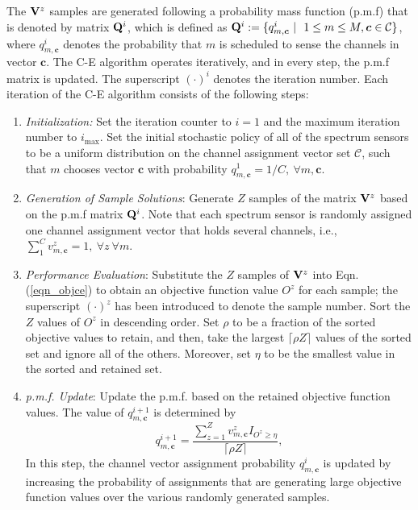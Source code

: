 \documentclass[journal]{IEEEtran} \ifCLASSINFOpdf
\begin{document}
The ${\bf V}^z$ samples are generated following a probability mass function (p.m.f) that is denoted by matrix ${\bf Q}^i$, which is defined as ${\bf Q}^i := \{q_{m,\bm{c}}^i~|~\ 1 \leq m \leq M, \bm{c} \in \mathcal{C}\}$, where $q_{m,\bm{c}}^i$ denotes the probability that $m$ is scheduled to sense the channels in vector $\bm{c}$. The C-E algorithm operates iteratively, and in every step, the p.m.f matrix is updated. The superscript $(\cdot)^i$ denotes the iteration number. Each iteration of the C-E algorithm consists of the following steps:
\begin{enumerate}[]
\item \textit{Initialization:} Set the iteration counter to $i = 1$ and the maximum iteration number to $i_{\max}$. Set the initial stochastic policy of all of the spectrum sensors to be a uniform distribution on the channel assignment vector set $\mathcal{C}$, such that $m$ chooses vector $\bm{c}$ with probability $q_{m,\bm{c}}^1 = 1/C, ~\forall m, \bm{c}$.

\item \textit{Generation of Sample Solutions}: Generate $Z$ samples of the matrix ${\bf V}^z$ based on the p.m.f matrix ${\bf Q}^i$. Note that each spectrum sensor is randomly assigned one channel assignment vector that holds several channels, i.e., $\sum_{1}^{C} v^z_{m,\bm{c}} =1, ~ \forall z ~\forall m$. \label{ce_gs}

\item \textit{Performance Evaluation}: Substitute the $Z$ samples of ${\bf V}^z$ into Eqn. (\ref{eqn_objce}) to obtain an objective function value $O^z$ for each sample; the superscript $(\cdot)^z$ has been introduced to denote the sample number. Sort the $Z$ values of $O^z$ in descending order. Set $\rho$ to be a fraction of the sorted objective values to retain, and then, take the largest $\lceil \rho Z \rceil$ values of the sorted set and ignore all of the others. Moreover, set $\eta$ to be the smallest value in the sorted and retained set.

\item \textit{p.m.f. Update}: Update the p.m.f. based on the retained objective function values. The value of $q_{m,\bm{c}}^{i+1}$ is determined by
    \begin{equation}
    \label{C-D_Update}
    q_{m,\bm{c}}^{i+1} = \frac{\sum_{z=1}^Z v^z_{m,\bm{c}} I_{O^z \geq \eta}}{\lceil \rho Z \rceil},
    \end{equation}
In this step, the channel vector assignment probability $q_{m,\bm{c}}^i$ is updated by increasing the probability of assignments that are generating large objective function values over the various randomly generated samples.


\end{enumerate}
\end{document}
